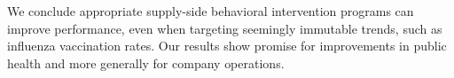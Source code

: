  We conclude appropriate supply-side behavioral intervention programs can improve performance, even when targeting seemingly immutable trends, such as influenza vaccination rates. Our results show promise for improvements in public health and more generally for company operations.
 
 
 